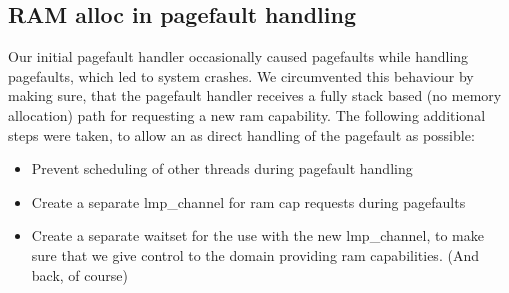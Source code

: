 \subsection{RAM alloc in pagefault handling}\label{ss:pagefault_ram}
Our initial pagefault handler occasionally caused pagefaults while handling pagefaults, which led to system crashes. We circumvented this behaviour by making sure, that the pagefault handler receives a fully stack based (no memory allocation) path for requesting a new ram capability. The following additional steps were taken, to allow an as direct handling of the pagefault as possible:
\begin{itemize}
	\item Prevent scheduling of other threads during pagefault handling
	\item Create a separate lmp\_channel for ram cap requests during pagefaults
	\item Create a separate waitset for the use with the new lmp\_channel, to make sure that we give control to the domain providing ram capabilities. (And back, of course)
\end{itemize}






